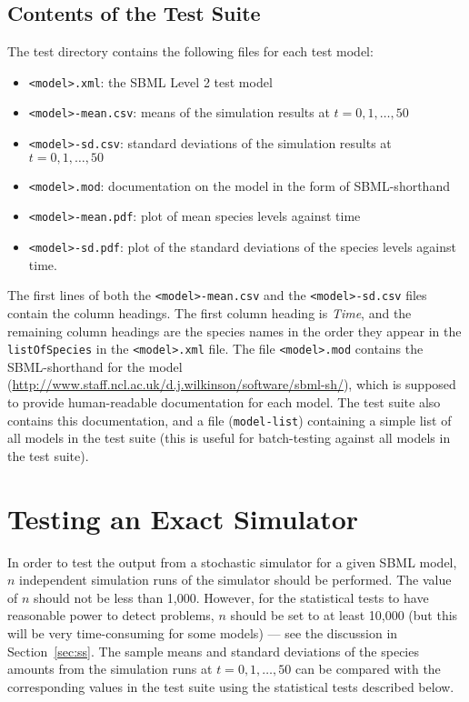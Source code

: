 \documentclass[12pt,a4paper]{article}
\begin{document}
\subsection{Contents of the Test Suite}

The test directory contains the following files for each test model: 
\begin{itemize}
\item \verb$<model>.xml$: the SBML Level 2 test model
\item \verb$<model>-mean.csv$: means of the simulation results at $t = 0,1,\ldots,50$
\item \verb$<model>-sd.csv$: standard deviations of the simulation results at $t = 0,1,\ldots,50$
\item \verb$<model>.mod$: documentation on the model in the form of SBML-shorthand
\item \verb$<model>-mean.pdf$: plot of mean species levels against time 
\item \verb$<model>-sd.pdf$: plot of the standard deviations of the species levels against time. 
\end{itemize}
The first lines of both the \verb$<model>-mean.csv$ and the
\verb$<model>-sd.csv$ files contain the column headings. The first
column heading is \emph{Time}, and the remaining column headings are
the species names in the order they appear in the \verb$listOfSpecies$
in the \verb$<model>.xml$ file. The file \verb$<model>.mod$ contains
the SBML-shorthand for the model
(\url{http://www.staff.ncl.ac.uk/d.j.wilkinson/software/sbml-sh/}),
which is supposed to provide human-readable documentation for each
model. The test suite also contains this documentation, and a file
(\verb$model-list$) containing a simple list of all models in the test
suite (this is useful for batch-testing against all models in the test
suite).

\section{Testing an Exact Simulator}

In order to test the output from a stochastic simulator for a given
SBML model, $n$ independent simulation runs of the simulator should be
performed. The value of $n$ should not be less than 1,000. However,
for the statistical tests to have reasonable power to detect problems,
$n$ should be set to at least 10,000 (but this will be very
time-consuming for some models) --- see the discussion in
Section~\ref{sec:ss}. The sample means and standard
deviations of the species amounts from the simulation runs at
$t=0,1,\ldots,50$ can be compared with the corresponding values in the
test suite using the statistical tests described below.
\end{document}
